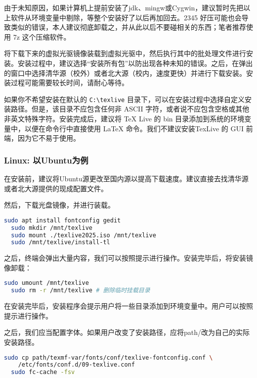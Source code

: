 \documentclass[../main.tex]{subfiles}
\begin{document}
由于未知原因，如果计算机上提前安装了jdk、mingw或Cygwin，建议暂时先把以上软件从环境变量中剔除，等整个安装好了以后再加回去。2345 好压可能也会导致类似的错误，本人建议彻底卸载之，并从此以后不要碰相关的东西；笔者推荐使用 7z 这个压缩软件。

将下载下来的虚拟光驱镜像装载到虚拟光驱中，然后执行其中的批处理文件进行安装。安装过程中，建议选择“安装所有包”以防出现各种未知的错误。之后，在弹出的窗口中选择清华源（校外）或者北大源（校内，速度更快）并进行下载安装。安装过程可能需要较长时间，请耐心等待。

如果你不希望安装在默认的 \texttt{C:\textbackslash texlive} 目录下，可以在安装过程中选择自定义安装路径。但是，该目录不应包含任何非 ASCII 字符，或者说不应包含空格或其他非英文特殊字符。安装完成后，建议将 TeX Live 的 bin 目录添加到系统的环境变量中，以便在命令行中直接使用 LaTeX 命令。我们不建议安装TexLive 的 GUI 前端，因为它不易于使用。

\subsubsection{Linux: 以Ubuntu为例}

在安装前，建议将Ubuntu源更改至国内源以提高下载速度。建议直接去找清华源或者北大源提供的现成配置文件。

然后，下载光盘镜像，并进行装载。

\begin{lstlisting}[language=bash]
  sudo apt install fontconfig gedit
  sudo mkdir /mnt/texlive
  sudo mount ./texlive2025.iso /mnt/texlive
  sudo /mnt/texlive/install-tl
\end{lstlisting}

之后，终端会弹出大量内容，我们可以按照提示进行操作。安装完毕后，将安装镜像卸载：

\begin{lstlisting}[language=bash]
  sudo umount /mnt/texlive
  sudo rm -r /mnt/texlive # 删除临时挂载目录
\end{lstlisting}

在安装完毕后，安装程序会提示用户将一些目录添加到环境变量中。用户可以按照提示进行操作。

之后，我们应当配置字体。如果用户改变了安装路径，应将path/改为自己的实际安装路径。

\begin{lstlisting}[language=bash]
  sudo cp path/texmf-var/fonts/conf/texlive-fontconfig.conf \
    /etc/fonts/conf.d/09-texlive.conf
  sudo fc-cache -fsv
\end{lstlisting}
\end{document}
